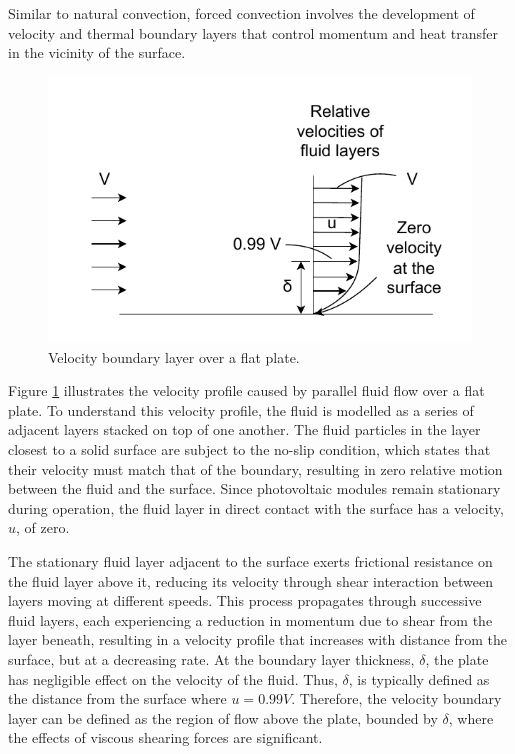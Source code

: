 Similar to natural convection, forced convection involves the development of velocity and thermal boundary layers that control momentum and heat transfer in the vicinity of the surface.\vspace{0.5em}

\begin{figure}[H]
    \centering
    \includegraphics[width=0.6\linewidth]{Figures/velocity_boundary_layer.pdf}
    \caption{Velocity boundary layer over a flat plate. \cite{Cengel2014FundamentalsConvection}}
    \label{fig:velocity_boundary_layer}
\end{figure}

Figure \ref{fig:velocity_boundary_layer} illustrates the velocity profile caused by parallel fluid flow over a flat plate. To understand this velocity profile, the fluid is modelled as a series of adjacent layers stacked on top of one another. The fluid particles in the layer closest to a solid surface are subject to the no-slip condition, which states that their velocity must match that of the boundary, resulting in zero relative motion between the fluid and the surface. Since photovoltaic modules remain stationary during operation, the fluid layer in direct contact with the surface has a velocity, $u$, of zero. \cite{Cengel2014FundamentalsConvection}\vspace{0.5em}

The stationary fluid layer adjacent to the surface exerts frictional resistance on the fluid layer above it, reducing its velocity through shear interaction between layers moving at different speeds. This process propagates through successive fluid layers, each experiencing a reduction in momentum due to shear from the layer beneath, resulting in a velocity profile that increases with distance from the surface, but at a decreasing rate. At the boundary layer thickness, $\delta$, the plate has negligible effect on the velocity of the fluid. Thus, $\delta$, is typically defined as the distance from the surface where $u = 0.99V$. Therefore, the velocity boundary layer can be defined as the region of flow above the plate, bounded by $\delta$, where the effects of viscous shearing forces are significant. \cite{Cengel2014FundamentalsConvection}\vspace{0.5em}

